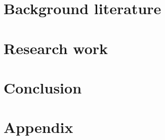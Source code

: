 \documentclass{book}
\begin{document}


\chapter{Background literature \label{Chapter:Review}}



\newpage


\newpage



\chapter{Research work \label{Chapter:Work}}











\chapter{Conclusion \label{Conclusion}}



\chapter{Appendix}
\label{Appendix}

\newpage

\newpage

\newpage

\newpage

\newpage

\newpage

\newpage

\newpage


%


%

\end{document}
